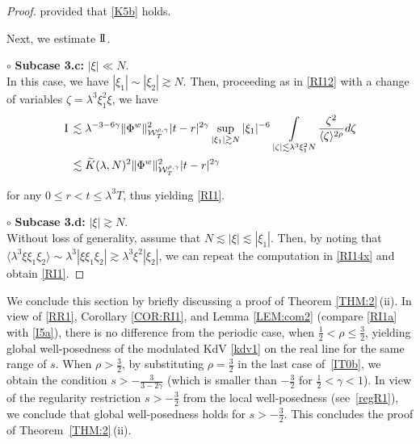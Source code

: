 \documentclass[letterpaper, 11pt,  reqno]{amsart}
\DeclareMathOperator*{\intt}{\int}
\newcommand{\1}{\hspace{0.5mm}\text{I}\hspace{0.5mm}}
\newcommand{\II}{\text{I \hspace{-2.8mm} I} }
\newcommand{\noi}{\noindent}
\newcommand{\g}{\gamma}
\newcommand{\ld}{\lambda}
\newcommand{\wt}{\widetilde}
\newcommand{\les}{\lesssim}
\newcommand{\ges}{\gtrsim}
\newcommand{\jb}[1]
{\langle #1 \rangle}
\newcommand{\W}{\mathcal{W}}
\newcommand{\z}{\zeta}
\numberwithin{equation}{section}
\numberwithin{theorem}{section}
\begin{document}
\begin{proof}
\noi
provided that 
  \eqref{K5b} holds.




\medskip

Next, we  estimate $\II$.


\medskip

\noi
$\circ$ {\bf Subcase 3.c:}  $|\xi| \ll N$.\\
\indent
In this case, we have 
  $|\xi_1|\sim |\xi_2|\ges N$.
Then, proceeding as in \eqref{RI12}
with 
a change of variables $\z = \ld^3 \xi_1^2 \xi$, we have 
\begin{align*}
\1
& \les 
\ld^{-3- 6\g}
 \| \Phi^{w} \|^2_{\W_{T}^{\rho, \g}}  
|t-r|^{2\g}
\sup_{|\xi_1|\ges N}|\xi_1|^{-6}
\intt_{ |\z|\les \ld^3 \xi_1^2N } \frac{\z^{2}}{\jb{\z}^{2\rho}}d \z\\
 &\les 
\wt K(\ld, N)^2
 \| \Phi^{w} \|^2_{\W_{T}^{\rho, \g}}  
|t-r|^{2\g}
\end{align*}

\noi
for any $0\leq r<t\leq \ld^3T$, 
thus yielding \eqref{RI1}.




\medskip

\noi
$\circ$ {\bf Subcase 3.d:}  $|\xi| \ges N$.\\
\indent
Without loss of generality, assume that $N \les |\xi| \les |\xi_1|$.
Then, by noting
that $\jb{\ld^3 \xi \xi_1 \xi_2} \sim 
\ld^3 |\xi \xi_1 \xi_2|
\ges \ld^3 \xi^2 |\xi_2|$, 
we can repeat the computation in \eqref{RI14x}
and obtain \eqref{RI1}.
\end{proof}








We conclude this section by briefly discussing a proof of Theorem 
\ref{THM:2}\,(ii).
In view of 
\eqref{RR1}, Corollary \ref{COR:RI1}, 
and Lemma \ref{LEM:com2}
(compare \eqref{RI1a} with \eqref{I5a}), 
there is no difference from the periodic case, when $\frac 12< \rho \le \frac 32$, 
yielding 
global well-posedness of the modulated KdV \eqref{kdv1} on the real line
for the same range of $s$.
When $\rho > \frac 32$, 
by substituting $\rho = \frac 32$ in the last case of~\eqref{IT0b}, 
we obtain the condition $s > - \frac 3{3- 2\g}$ (which is smaller than $-\frac 32$ for $\frac 12 < \g < 1$).
In view of the regularity restriction $s > - \frac 32$
from the local well-posedness (see~\eqref{regR1}), 
we conclude that global well-posedness
holds for  $s > - \frac  32$.
This concludes the proof of Theorem~\ref{THM:2}\,(ii).
\end{document}
